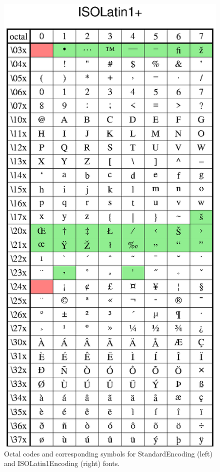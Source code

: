 \begin{figure}[h]
   \includegraphics[scale=0.92]{scripts/GMT_App_F_iso+}
   \caption{Octal codes and corresponding symbols for StandardEncoding (left)
   and ISOLatin1Encoding (right) fonts.}
   \label{fig:GMT_App_F_text}
\end{figure}

